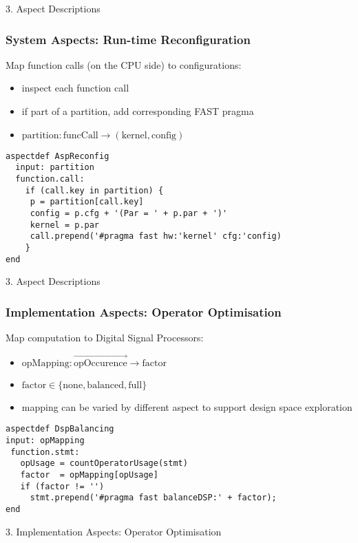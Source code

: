 \begin{frame}[fragile]{3. Aspect Descriptions}
  \frametitle{ System Aspects: Run-time Reconfiguration}
  Map function calls (on the CPU side) to configurations:
  \begin{itemize}
  \item inspect each function call
  \item if part of a partition, add corresponding FAST pragma
  \item $ \text{partition} : \text{funcCall} \rightarrow (\text{kernel}, \text{config}) $
  \end{itemize}

  \begin{lstlisting}[style=lara]
aspectdef AspReconfig
  input: partition
  function.call:
    if (call.key in partition) {
     p = partition[call.key]
     config = p.cfg + '(Par = ' + p.par + ')'
     kernel = p.par
     call.prepend('#pragma fast hw:'kernel' cfg:'config)
    }
end
  \end{lstlisting}
\end{frame}


\begin{frame}[fragile]{3. Aspect Descriptions}
  \frametitle{Implementation Aspects: Operator Optimisation}
  Map computation to Digital Signal Processors:
  \begin{itemize}
  \item $ \text{opMapping} : \overrightarrow{\text{opOccurence}} \rightarrow \text{factor}$
  \item $\text{factor} \in \{\text{none}, \text{balanced}, \text{full}\} $
  \item mapping can be varied by different aspect to support design
    space exploration
  \end{itemize}
  \begin{lstlisting}[label=lst:label, style=lara]
aspectdef DspBalancing
input: opMapping
 function.stmt:
   opUsage = countOperatorUsage(stmt)
   factor  = opMapping[opUsage]
   if (factor != '')
     stmt.prepend('#pragma fast balanceDSP:' + factor);
end
  \end{lstlisting}
\end{frame}

\begin{frame}{3. Implementation Aspects: Operator Optimisation}
  \begin{figure}[!ht]
    \centering
    \def\svgwidth{\linewidth}
    
  \end{figure}

\end{frame}

